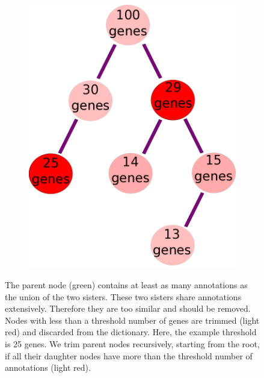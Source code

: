 \documentclass[linenumbers, doublespacing]{bmcart}
\begin{document}
\begin{backmatter}
\begin{figure}[h!]
\begin{subfigure}[b]{0.3\textwidth}
    \includegraphics[width=\textwidth]{figures/CeilingTrimmingOntogeny.png}
    	\caption{}
    \label{fig:trim_roots}
  \end{subfigure}

  \captionsetup{width= 0.95\textwidth}
  \caption{
     The parent node (green) contains at least as many annotations as the union of the two sisters. These two sisters share annotations extensively. Therefore they are too similar and should be removed.
	 Nodes with less than a threshold number of genes are trimmed (light red) and discarded from the dictionary. Here, the example threshold is 25 genes.
	 We trim parent nodes recursively, starting from the root, if all their daughter nodes have more than the threshold number of annotations (light red).
  }
\end{figure}



\end{backmatter}
\end{document}
